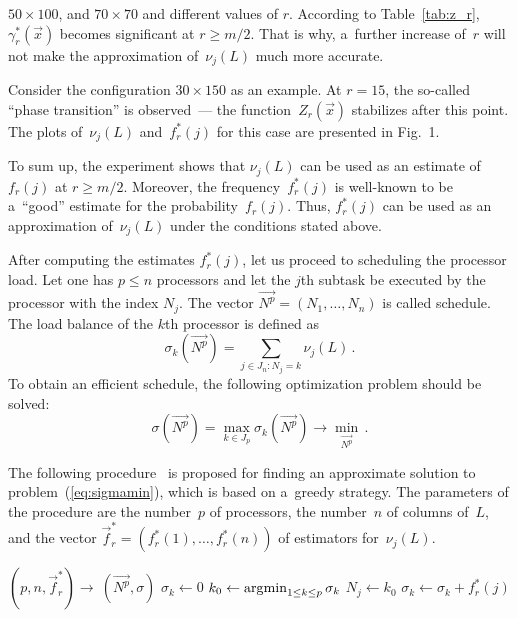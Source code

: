 \begin{multicols}{2}
\vspace*{18pt}

\addtocounter{figure}{1}


\noindent
 $50{\times}100$, and $70{\times}70$
and different values of $r$.
According to Table~\ref{tab:z_r}, $\gamma_r^*(\vec{x})$ becomes
significant at $r \ge m/2$. That is why, a~further increase of~$r$
will not make the approximation of~$\nu_j(L)$ much more accurate.

Consider the configuration $30{\times}150$ as an example. At
$r=15$, the so-called ``phase transition'' is observed~--- the
function~$Z_r(\vec{x})$ stabilizes after this point.
The plots of~$\nu_j(L)$ and~$f_r^*(j)$ for this case are presented
in Fig.~1.

To sum up, the experiment shows that $\nu_j(L)$ can be used as an
estimate of~$f_r(j)$ at $r \ge m/2$.
Moreover, the frequency~$f^*_r(j)$ is well-known to be a~``good''
estimate for the probability~$f_r(j)$.
Thus, $f^*_r(j)$ can be used as an approximation of~$\nu_j(L)$
under the conditions stated above.

After computing the estimates $f_r^*(j)$, let us proceed to 
scheduling the processor load.
Let one has $p\leq n$ processors and let the $j$th subtask 
be executed by the processor
with the index $N_j$.
The vector $\vec{N^p}=(N_1,\dots,N_n)$ is called {schedule}.
The {load balance} of the $k$th processor is defined as
$$
\sigma_k(\vec{N^p}) = \sum\limits_{j\in J_n: N_j=k}{\nu_j(L)}\,.
$$
To obtain an efficient schedule, the following optimization problem should be solved:
\begin{equation}
\label{eq:sigmamin}
\sigma(\vec{N^p}) = \max_{k \in J_p} {\sigma_k(\vec{N^p})} \to \min_{\vec{N^p}}\,.
\end{equation}


The following procedure~  is proposed
for finding an approximate
solution to problem~(\ref{eq:sigmamin}),
which is based on a~greedy strategy.
The parameters of the procedure are the number~$p$ of processors, the number~$n$ of
columns of~$L$, and the
vector $\vec f^*_r = (f^*_r(1), \dots, f^*_r(n))$ of estimators for~$\nu_j(L)$.


\begin{AlgProcedure}{$(p, n, \vec f^*_r)\rightarrow~(\vec{N^p},\sigma)$\hspace*{-43.4pt}}
    \STATE $\sigma_k \leftarrow 0$
    \ENDFOR
    \STATE $k_0 \leftarrow \mathop{\mathrm{arg}\mathrm{min}}_{1 \le k \le p}{\sigma_k}$
    \STATE $N_j \leftarrow k_0$
    \STATE $\sigma_k \leftarrow \sigma_k + f^*_r(j)$
    \ENDFOR
\end{AlgProcedure}




\end{multicols}
